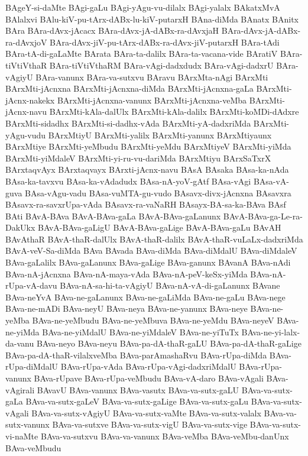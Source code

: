 {BAgeY-si-daMte
BAgi-gaLu
BAgi-yAgu-vu-dilalx
BAgi-yalalx
BAkatxMvA
BAlalxvi
BAlu-kiV-pu-tArx-dABx-lu-kiV-putarxH
BAna-diMda
BAnatx
BAnitx
BAra
BAra-dAvx-jAcacx
BAra-dAvx-jA-dABx-ra-dAvxjaH
BAra-dAvx-jA-dABx-ra-dAvxjoV
BAra-dAvx-jiV-pu-tArx-dABx-ra-dAvx-jiV-putarxH
BAra-tAdi
BAra-tA-di-gaLaMte
BArata
BAra-ta-dalilx
BAra-ta-vacana-vide
BAratiV
BAra-tiVtiVthaR
BAra-tiVtiVthaRM
BAra-vAgi-dadxdudx
BAra-vAgi-dadxrU
BAra-vAgiyU
BAra-vanunx
BAra-va-sutxvu
BAravu
BArxMta-nAgi
BArxMti
BArxMti-jAcnxna
BArxMti-jAcnxna-diMda
BArxMti-jAcnxna-gaLa
BArxMti-jAcnx-nakekx
BArxMti-jAcnxna-vanunx
BArxMti-jAcnxna-veMba
BArxMti-jAcnx-navu
BArxMti-kAla-dalUlx
BArxMti-kAla-dalilx
BArxMti-koMDi-dAdxre
BArxMti-sidadhx
BArxMti-si-dadhx-vAda
BArxMti-yA-dadxriMda
BArxMti-yAgu-vudu
BArxMtiyU
BArxMti-yalilx
BArxMti-yanunx
BArxMtiyaunx
BArxMtiye
BArxMti-yeMbudu
BArxMti-yeMdu
BArxMtiyeV
BArxMti-yiMda
BArxMti-yiMdaleV
BArxMti-yi-ru-vu-dariMda
BArxMtiyu
BArxSaTxrX
BArxtaqvAyx
BArxtaqvayx
BArxti-jAcnx-navu
BAsA
BAsaka
BAsa-ka-nAda
BAsa-ka-tavxvu
BAsa-ka-vAdadudx
BAsa-nA-yoV-gAtf
BAsa-vAgi
BAsa-vA-guva
BAsa-vAgu-vadu
BAsa-vuMTA-gu-vudo
BAsavx-divx-jAcnxna
BAsavxra
BAsavx-ra-savxrUpa-vAda
BAsavx-ra-vaNaRH
BAsayx-BA-sa-ka-BAva
BAsf
BAti
BAvA-BAva
BAvA-BAva-gaLa
BAvA-BAva-gaLanunx
BAvA-BAva-ga-Le-ra-DakUkx
BAvA-BAva-gaLigU
BAvA-BAva-gaLige
BAvA-BAva-gaLu
BAvAH
BAvAthaR
BAvA-thaR-dalUlx
BAvA-thaR-dalilx
BAvA-thaR-vuLaLx-dadxriMda
BAvA-veV-Sa-diMda
BAva
BAvada
BAva-diMda
BAva-diMdalU
BAva-diMdaleV
BAva-gaLalilx
BAva-gaLanunx
BAva-gaLige
BAva-ganunx
BAvanA
BAva-nAdi
BAva-nA-jAcnxna
BAva-nA-maya-vAda
BAva-nA-peV-keSx-yiMda
BAva-nA-rUpa-vA-davu
BAva-nA-sa-hi-ta-vAgiyU
BAva-nA-vA-di-gaLanunx
BAvane
BAva-neYvA
BAva-ne-gaLanunx
BAva-ne-gaLiMda
BAva-ne-gaLu
BAva-nege
BAva-ne-mADi
BAva-neyU
BAva-neya
BAva-ne-yanunx
BAva-neye
BAva-ne-yeMba
BAva-ne-yeMbudu
BAva-ne-yeMbuva
BAva-ne-yeMdu
BAva-neyeV
BAva-ne-yiMda
BAva-ne-yiMdalU
BAva-ne-yiMdaleV
BAva-ne-yiTuTx
BAva-ne-yi-lalx-da-vanu
BAva-neyo
BAva-neyu
BAva-pa-dA-thaR-gaLU
BAva-pa-dA-thaR-gaLige
BAva-pa-dA-thaR-vilalxveMba
BAva-parAmashaRvu
BAva-rUpa-diMda
BAva-rUpa-diMdalU
BAva-rUpa-vAda
BAva-rUpa-vAgi-dadxriMdalU
BAva-rUpa-vanunx
BAva-rUpave
BAva-rUpa-veMbudu
BAva-vA-daro
BAva-vAgali
BAva-vAgirali
BAvavU
BAva-vanunx
BAva-vasutx
BAva-va-sutx-gaLU
BAva-va-sutx-gaLa
BAva-va-sutx-gaLeV
BAva-va-sutx-gaLige
BAva-va-sutx-gaLu
BAva-va-sutx-vAgali
BAva-va-sutx-vAgiyU
BAva-va-sutx-vaMte
BAva-va-sutx-valalx
BAva-va-sutx-vanunx
BAva-va-sutxve
BAva-va-sutx-vigU
BAva-va-sutx-vige
BAva-va-sutx-vi-naMte
BAva-va-sutxvu
BAva-va-vanunx
BAva-veMba
BAva-veMbu-danUnx
BAva-veMbudu
}
